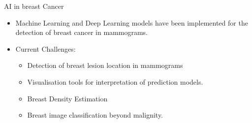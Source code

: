 \begin{frame}{AI in breast Cancer}
    \begin{itemize}
        \item Machine Learning and Deep Learning models have been implemented for the detection of breast cancer in mammograms. 
        \item Current Challenges:
        \begin{itemize}
            \item Detection of breast lesion location in mammograms 
            \item Visualisation tools for interpretation of prediction models.
            \item Breast Density Estimation
            \item Breast image classification beyond malignity.
        \end{itemize}
    \end{itemize}
    
\end{frame}

